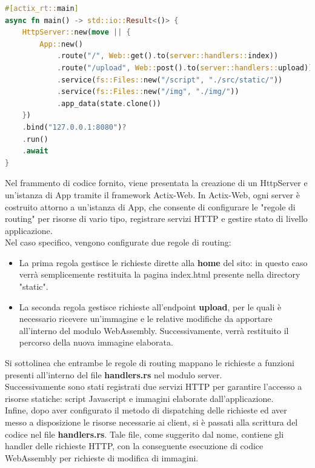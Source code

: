 \begin{lstlisting}[language=rust, label=lst:RustWasi, caption={Porzione del file main.rs}, showstringspaces=false]
#[actix_rt::main]
async fn main() -> std::io::Result<()> {
    HttpServer::new(move || {
        App::new()
            .route("/", Web::get().to(server::handlers::index))
            .route("/upload", Web::post().to(server::handlers::upload))
            .service(fs::Files::new("/script", "./src/static/"))
            .service(fs::Files::new("/img", "./img/"))
            .app_data(state.clone())
    })
    .bind("127.0.0.1:8080")?
    .run()
    .await
}
\end{lstlisting}
Nel frammento di codice fornito, viene presentata la creazione di un HttpServer e un'istanza di App tramite il framework Actix-Web.
In Actix-Web, ogni server è costruito attorno a un'istanza di App, che consente di configurare le "regole di routing" per risorse di vario tipo, registrare servizi HTTP e gestire stato di livello applicazione.
\\Nel caso specifico, vengono configurate due regole di routing:
\begin{itemize}
    \item La prima regola gestisce le richieste dirette alla \textbf{home} del sito: in questo caso verrà semplicemente restituita la pagina index.html presente nella directory "static".
    \item La seconda regola gestisce richieste all'endpoint \textbf{upload}, per le quali è necessario ricevere un'immagine e le relative modifiche da apportare all'interno del modulo WebAssembly. Successivamente, verrà restituito il percorso della nuova immagine elaborata.
\end{itemize}
Si sottolinea che entrambe le regole di routing mappano le richieste a funzioni presenti all'interno del file \textbf{handlers.rs} nel modulo server.
\\Successivamente sono stati registrati due servizi HTTP  per garantire l'accesso a risorse statiche: script Javascript e immagini elaborate dall'applicazione.
\\Infine, dopo aver configurato il metodo di dispatching delle richieste ed aver messo a disposizione le risorse necessarie ai client, si è passati alla scrittura del codice nel file \textbf{handlers.rs}. Tale file, come suggerito dal nome, contiene gli handler delle richieste HTTP, con la conseguente esecuzione di codice WebAssembly per richieste di modifica di immagini.
\newpage
